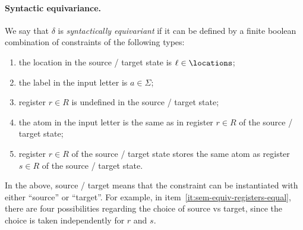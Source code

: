 \paragraph{Syntactic equivariance.} We say that $\delta$ is \emph{syntactically equivariant} if it can be defined by a finite boolean combination of constraints of the following types:
\begin{enumerate}
	\item the location in the source / target state is $\ell \in \locations$;
	\item the label in the input letter is $a \in \Sigma$;
	\item register $r \in R$ is undefined in the source / target state;
	\item the atom in the input letter is the same as in register $r \in R$ of the source / target state;
	\item \label{it:sem-equiv-registers-equal} register $r \in R$ of the source / target state stores the same atom as register $s \in R$ of the source / target state.
\end{enumerate}
In the above, source / target means that the constraint can be instantiated with either ``source'' or ``target''. For example, 
in item~\ref{it:sem-equiv-registers-equal}, there are four possibilities regarding the choice of source vs target, since the choice is taken independently for $r$ and $s$. 


